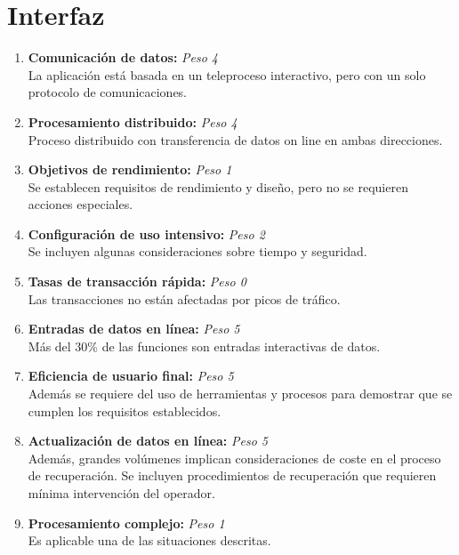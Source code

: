 \documentclass[11pt,a4paper,spanish,twoside]{book}
\begin{document}
\section{Interfaz}
\begin{enumerate}[{\bf 1.}]

\item {\bf Comunicación de datos:} \emph{Peso 4} \\ La aplicación está basada en
  un teleproceso interactivo, pero con un solo protocolo de comunicaciones.

\item {\bf Procesamiento distribuido:} \emph{Peso 4} \\ Proceso distribuido
  con transferencia de datos on line en ambas direcciones. 

\item {\bf Objetivos de rendimiento:} \emph{Peso 1} \\ Se establecen requisitos
  de rendimiento y diseño, pero no se requieren acciones especiales.

\item {\bf Configuración de uso intensivo:} \emph{Peso 2} \\ Se incluyen algunas
  consideraciones sobre tiempo y seguridad. 

\item {\bf Tasas de transacción rápida:} \emph{Peso 0} \\ Las transacciones no
  están afectadas por picos de tráfico. 

\item {\bf Entradas de datos en línea:} \emph{Peso 5} \\ Más del 30\% de las
  funciones son entradas interactivas de datos. 

\item {\bf Eficiencia de usuario final:} \emph{Peso 5} \\ Además se requiere del
  uso de herramientas y procesos para demostrar que se cumplen los requisitos
  establecidos.

\item {\bf Actualización de datos en línea:} \emph{Peso 5} \\ Además, grandes
  volúmenes implican consideraciones de coste en el proceso de
  recuperación. Se incluyen procedimientos de recuperación que requieren
  mínima intervención del operador. 

\item {\bf Procesamiento complejo:} \emph{Peso 1} \\ Es aplicable una de las
  situaciones descritas. 


\end{enumerate}
\end{document}
